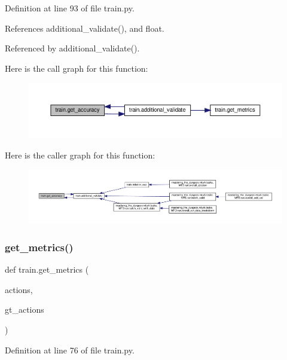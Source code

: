 Definition at line 93 of file train.\+py.



References additional\+\_\+validate(), and float.



Referenced by additional\+\_\+validate().

Here is the call graph for this function\+:
\nopagebreak
\begin{figure}[H]
\begin{center}
\leavevmode
\includegraphics[width=350pt]{namespacetrain_a55c2b31c8e13b7aa621b3954392bdb93_cgraph}
\end{center}
\end{figure}
Here is the caller graph for this function\+:
\nopagebreak
\begin{figure}[H]
\begin{center}
\leavevmode
\includegraphics[width=350pt]{namespacetrain_a55c2b31c8e13b7aa621b3954392bdb93_icgraph}
\end{center}
\end{figure}
\mbox{\label{namespacetrain_ad644487baaf3b94d8a6b32b0f6e88e15}} 
\subsubsection{\texorpdfstring{get\+\_\+metrics()}{get\_metrics()}}
{\footnotesize\ttfamily def train.\+get\+\_\+metrics (\begin{DoxyParamCaption}\item[{}]{actions,  }\item[{}]{gt\+\_\+actions }\end{DoxyParamCaption})}



Definition at line 76 of file train.\+py.



